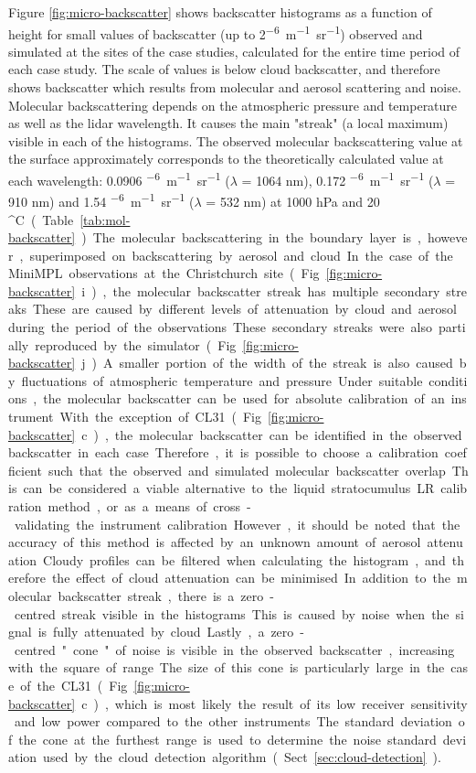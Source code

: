 Figure \ref{fig:micro-backscatter} shows backscatter histograms as a function of
height for small values of backscatter (up to 2\unit{^{-6}m^{-1}sr^{-1}})
observed and simulated at the sites of the case studies, calculated for
the entire time period of each case study. The scale of values is below
cloud backscatter, and therefore shows backscatter which results from molecular and
aerosol scattering and noise. Molecular backscattering depends on the
atmospheric pressure and temperature as well as the lidar wavelength.
It causes the main "streak" (a local maximum) visible in each of the histograms. The observed molecular
backscattering value at the surface approximately corresponds to the
theoretically calculated value at each wavelength: 0.0906 \unit{^{-6}m^{-1}sr^{-1}} ($\lambda$ = 1064 nm),
0.172 \unit{^{-6}m^{-1}sr^{-1}} ($\lambda$ = 910 nm) and 1.54 \unit{^{-6}m^{-1}sr^{-1}} ($\lambda$ = 532 nm) at 1000 hPa and 20 \unit{^\circ C}
(Table \ref{tab:mol-backscatter}). The molecular backscattering in the boundary
layer is, however, superimposed on backscattering by aerosol and cloud. In the case
of the MiniMPL observations at the Christchurch site (Fig. \ref{fig:micro-backscatter}i),
the molecular backscatter streak has multiple secondary streaks. These are caused by different levels
of attenuation by cloud and aerosol during the period of the observations.
These secondary streaks were also partially reproduced by the simulator
(Fig. \ref{fig:micro-backscatter}j).
A smaller portion of the width of the streak is also caused by fluctuations of atmospheric
temperature and pressure. Under suitable conditions, the molecular backscatter
can be used for absolute calibration of an instrument. With the exception 
of CL31 (Fig. \ref{fig:micro-backscatter}c), the molecular backscatter can
be identified in the observed backscatter in each case. Therefore, it is possible to
choose a calibration coefficient such that the observed and simulated
molecular backscatter overlap. This can be considered a viable alternative
to the liquid stratocumulus LR calibration method, or as a means of
cross-validating the instrument calibration. However, it should be noted that the accuracy of this method
is affected by an unknown amount of aerosol attenuation. Cloudy profiles
can be filtered when calculating the histogram, and therefore the effect of
cloud attenuation can be minimised.
In addition to the molecular backscatter streak,
there is a zero-centred streak visible in the histograms. This is caused
by noise when the signal is fully attenuated by cloud. Lastly, a zero-centred
"cone" of noise is visible in the observed backscatter, increasing with the
square of range. The size of this cone is particularly large in the case
of the CL31 (Fig. \ref{fig:micro-backscatter}c), which is most likely the result
of its low receiver sensitivity and low power compared to the other
instruments. The standard deviation of the cone at the furthest range
is used to determine the noise standard deviation used by the cloud
detection algorithm (Sect. \ref{sec:cloud-detection}).

